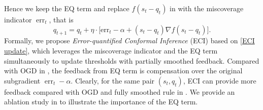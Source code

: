 Hence we keep the EQ term and replace $f(s_t-q_t)$ in  with the miscoverage indicator $\operatorname{err}_t$, that is
\begin{equation}
    q_{t+1} = q_t + \eta \cdot \big[\text{err}_t - \alpha+  (s_t-q_t) \nabla f(s_t-q_t)\big].
    \label{ECI update}
\end{equation}
Formally, we propose \textit{Error-quantified Conformal Inference} (ECI) based on \eqref{ECI update}, which leverages the miscoverage indicator and the EQ term simultaneously to update thresholds with partially smoothed feedback.
Compared with OGD in , the feedback from EQ term is compensation over the original subgradient $\operatorname{err}_t -\alpha$. Clearly, for the same pair $(s_t, q_t)$, ECI can provide more feedback compared with OGD and fully smoothed rule in . We provide an ablation study in  to illustrate the importance of the EQ term.








